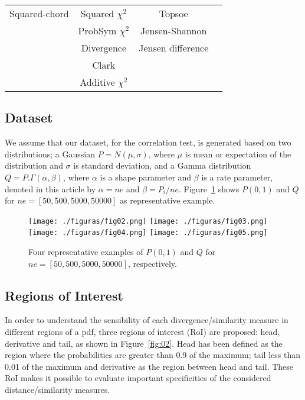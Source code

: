 \documentclass[conference]{IEEEtran}
\begin{document}
\begin{table}[!h]
\begin{tabular}{cccc}
		Squared-chord                      & Squared $\chi^2$       & Topsoe                     & \multicolumn{1}{c}{}                      \\
		& ProbSym $\chi^2$       & Jensen-Shannon             & \multicolumn{1}{c}{}                      \\
		& Divergence             & Jensen difference          & \multicolumn{1}{c}{}                      \\
		& Clark                  &                            & \multicolumn{1}{c}{}                      \\
		& Additive $\chi^2$      &                            & \multicolumn{1}{c}{}                      \\ \hline
	\end{tabular}
\end{table}


\subsection{Dataset}\label{dataset}

We assume that our dataset, for the correlation test, is generated based on two distributions; a Gaussian $P=N(\mu, \sigma)$, where $\mu$ is mean or expectation of the distribution and $\sigma$ is standard deviation, and a Gamma distribution $Q=P.\Gamma(\alpha,\beta)$, where $\alpha$ is a shape parameter and $\beta$ is a rate parameter, denoted in this article by $\alpha=ne$ and $\beta = P_i/ne$. Figure~\ref{fig:01} shows $P(0,1)$ and $Q$ for $ne=[50,500,5000,50000]$ as representative example.

\begin{figure}[!h]
  \centering
  \texttt{[image: ./figuras/fig02.png]}
  \texttt{[image: ./figuras/fig03.png]}\\
  \texttt{[image: ./figuras/fig04.png]}
  \texttt{[image: ./figuras/fig05.png]}\\
  \caption{Four representative examples of $P(0,1)$ and $Q$ for $ne=[50,500,5000,50000]$, respectively.}
  \label{fig:01}
\end{figure}


\subsection{Regions of Interest}

In order to understand the sensibility of each divergence/similarity measure in different regions of a pdf, three regions of interest (RoI) are proposed: head, derivative and tail, as shown in Figure~\ref{fig:02}. Head has been defined as the region where the probabilities are greater than 0.9 of the maximum; tail less than 0.01 of the maximum and derivative as the region between head and tail. 
These RoI makes it possible to evaluate important specificities of the considered distance/similarity measures.
\end{document}

